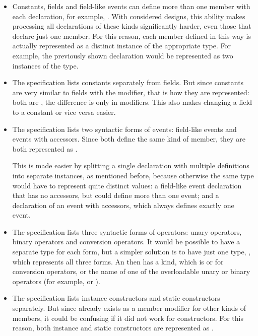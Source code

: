 \begin{itemize}
\item Constants, fields and field-like events can define more than one member with each declaration, for example, . With considered designs, this ability makes processing all declarations of these kinds significantly harder, even those that declare just one member. For this reason, each member defined in this way is actually represented as a distinct instance of the appropriate type. For example, the previously shown declaration would be represented as two instances of the  type.

\item The specification lists constants separately from fields. But since constants are very similar to fields with the  modifier, that is how they are represented: both are , the difference is only in modifiers. This also makes changing a field to a constant or vice versa easier.

\item The specification lists two syntactic forms of events: field-like events and events with accessors. Since both define the same kind of member, they are both represented as .

This is made easier by splitting a single declaration with multiple definitions into separate instances, as mentioned before, because otherwise the same type would have to represent quite distinct values: a field-like event declaration that has no accessors, but could define more than one event; and a declaration of an event with accessors, which always defines exactly one event.

\item The specification lists three syntactic forms of operators: unary operators, binary operators and conversion operators. It would be possible to have a separate type for each form, but a simpler solution is to have just one type, , which represents all three forms. An  then has a kind, which is  or  for conversion operators, or the name of one of the overloadable unary or binary operators (for example,  or ).

\item The specification lists instance constructors and static constructors separately. But since  already exists as a member modifier for other kinds of members, it could be confusing if it did not work for constructors. For this reason, both instance and static constructors are represented as .
\end{itemize}

